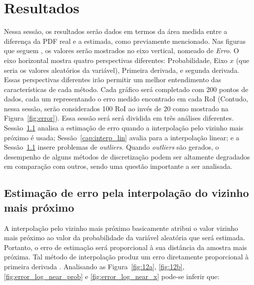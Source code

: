 \chapter{Resultados} \label{cap:resultados}
\vspace{-2cm}
Nessa sessão, os resultados serão dados em termos da área medida entre a diferença da \ac{PDF} real e a estimada, como previamente mencionado. Nas figuras que seguem , os valores serão mostrados no eixo vertical, nomeado de \textit{Erro}. O eixo horizontal mostra quatro perspectivas diferentes: Probabilidade, Eixo $ x $ (que seria os valores aleatórios da variável), Primeira derivada, e segunda derivada. Essas perspectivas diferentes irão permitir um melhor entendimento das características de cada método. Cada gráfico será completado com 200 pontos de dados, cada um representando o erro medido encontrado em cada \ac{RoI} (Contudo, nessa sessão, serão considerados 100 \ac{RoI} ao invés de 20 como mostrado na Figura~\ref{fig:error}). Essa sessão será será dividida em três análises diferentes. Sessão~\ref{cap:interp_neares} analisa a estimação de erro quando a interpolação pelo vizinho mais próximo é usada; Sessão~\ref{cap:interp_lin} avalia para a interpolação linear; e a Sessão~\ref{cap:interp_neares} insere problemas de \textit{outliers}. Quando \textit{outliers} são gerados, o desempenho de alguns métodos de discretização podem ser altamente degradados em comparação com outros, sendo uma questão importante a ser analisada.

\section{Estimação de erro pela interpolação do vizinho mais próximo} \label{cap:interp_neares}
A interpolação pelo vizinho mais próximo basicamente atribui o valor vizinho mais próximo ao valor da probabilidade da variável aleatória que será estimada. Portanto, o erro de estimação será proporcional à sua distância da amostra mais próxima. Tal método de interpolação produz um erro diretamente proporcional à primeira derivada \cite{gurevich1966integral}. Analisando as Figura~\ref{fig:12a}, \ref{fig:12b}, \ref{fig:error_log_near_prob} e \ref{fig:error_log_near_x} pode-se inferir que: 

